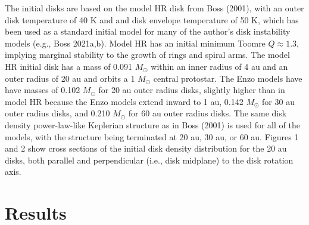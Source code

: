 \documentclass[12pt,preprint]{aastex}
\begin{document}
 The initial disks are based on the model HR disk from Boss (2001), with an outer disk temperature of 
40 K and and disk envelope temperature of 50 K, which has been used as a standard initial
model for many of the author's disk instability models (e.g., Boss 2021a,b).
Model HR has an initial minimum Toomre $Q \approx 1.3$, implying marginal stability to the
growth of rings and spiral arms. The model HR initial disk has a mass of 0.091
$M_\odot$ within an inner radius of 4 au and an outer radius of 20 au and 
orbits a 1 $M_\odot$ central protostar. The Enzo models have have masses of 
0.102 $M_\odot$ for 20 au outer radius disks, slightly higher than in model HR because 
the Enzo models extend inward to 1 au, 0.142 $M_\odot$ for 30 au 
outer radius disks, and 0.210 $M_\odot$ for 60 au outer radius disks.
The same disk density power-law-like Keplerian structure as in Boss (2001) is used for all
of the models, with the structure being terminated at 20 au, 30 au, or 60 au. 
Figures 1 and 2 show cross sections of the initial disk density distribution for the 20 au disks,
both parallel and perpendicular (i.e., disk midplane) to the disk rotation axis.

\section{Results}
\end{document}

